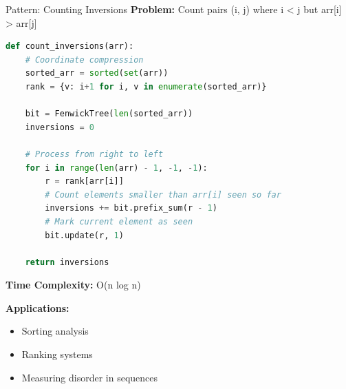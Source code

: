 \documentclass[aspectratio=169]{beamer}
\begin{document}
\begin{frame}[fragile]{Pattern: Counting Inversions}
  \textbf{Problem:} Count pairs (i, j) where i < j but arr[i] > arr[j]

  \begin{lstlisting}[language=Python, basicstyle=\ttfamily\tiny]
def count_inversions(arr):
    # Coordinate compression
    sorted_arr = sorted(set(arr))
    rank = {v: i+1 for i, v in enumerate(sorted_arr)}

    bit = FenwickTree(len(sorted_arr))
    inversions = 0

    # Process from right to left
    for i in range(len(arr) - 1, -1, -1):
        r = rank[arr[i]]
        # Count elements smaller than arr[i] seen so far
        inversions += bit.prefix_sum(r - 1)
        # Mark current element as seen
        bit.update(r, 1)

    return inversions
  \end{lstlisting}

  \vspace{0.3cm}
  \textbf{Time Complexity:} O(n log n)

  \vspace{0.3cm}
  \textbf{Applications:}
  \begin{itemize}
    \item Sorting analysis
    \item Ranking systems
    \item Measuring disorder in sequences
  \end{itemize}
\end{frame}
\end{document}
